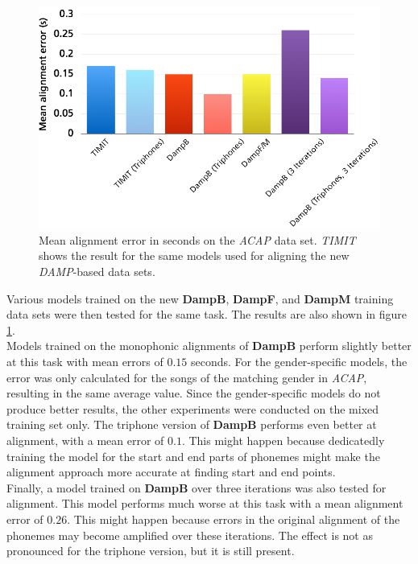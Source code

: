 \begin{figure}
	\begin{center}
		\includegraphics[width=.8\textwidth]{images/res_alignment.png}
		\caption{Mean alignment error in seconds on the \textit{ACAP} data set. \textit{TIMIT} shows the result for the same models used for aligning the new \textit{DAMP}-based data sets.}
		\label{fig:res_alignment}
	\end{center}
\end{figure}


Various models trained on the new \textbf{DampB}, \textbf{DampF}, and \textbf{DampM} training data sets were then tested for the same task. The results are also shown in figure \ref{fig:res_alignment}.\\
Models trained on the monophonic alignments of \textbf{DampB} perform slightly better at this task with mean errors of $0.15$ seconds. For the gender-specific models, the error was only calculated for the songs of the matching gender in \textit{ACAP}, resulting in the same average value. Since the gender-specific models do not produce better results, the other experiments were conducted on the mixed training set only. The triphone version of \textbf{DampB} performs even better at alignment, with a mean error of $0.1$. This might happen because dedicatedly training the model for the start and end parts of phonemes might make the alignment approach more accurate at finding start and end points.\\
Finally, a model trained on \textbf{DampB} over three iterations was also tested for alignment. This model performs much worse at this task with a mean alignment error of $0.26$. This might happen because errors in the original alignment of the phonemes may become amplified over these iterations. The effect is not as pronounced for the triphone version, but it is still present.


